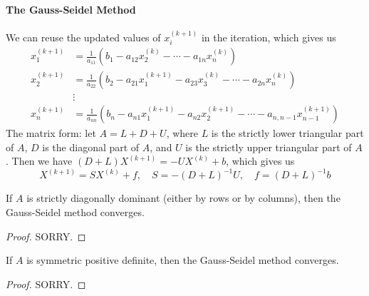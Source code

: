 \documentclass{matharticle}
\begin{document}
\paragraph{The Gauss-Seidel Method}
We can reuse the updated values of $x_i^{(k+1)}$ in the iteration, which gives us
\begin{equation}
	\begin{aligned}
		x_1^{(k+1)} & = \frac{1}{a_{11}} \left( b_1 - a_{12} x_2^{(k)} - \cdots - a_{1n} x_n^{(k)} \right)                                 \\
		x_2^{(k+1)} & = \frac{1}{a_{22}} \left( b_2 - a_{21} x_1^{(k+1)} - a_{23} x_3^{(k)} - \cdots - a_{2n} x_n^{(k)} \right)            \\
		            & \vdots                                                                                                               \\
		x_n^{(k+1)} & = \frac{1}{a_{nn}} \left( b_n - a_{n1} x_1^{(k+1)} - a_{n2} x_2^{(k+1)} - \cdots - a_{n,n-1} x_{n-1}^{(k+1)} \right)
	\end{aligned}
\end{equation}
The matrix form: let $A = L + D + U$, where $L$ is the strictly lower triangular part of $A$, $D$ is the diagonal part of $A$, and $U$ is the strictly upper triangular part of $A$. Then we have $(D + L) X^{(k+1)} = - U X^{(k)} + b$, which gives us
\begin{equation}
	X^{(k+1)} = S X^{(k)} + f, \quad S = -(D + L)^{-1} U, \quad f = (D + L)^{-1} b
\end{equation}

\begin{theorem}
	If $A$ is strictly diagonally dominant (either by rows or by columns), then the Gauss-Seidel method converges.
\end{theorem}
\begin{proof}
	SORRY.
\end{proof}

\begin{theorem}
	If $A$ is symmetric positive definite, then the Gauss-Seidel method converges.
\end{theorem}
\begin{proof}
	SORRY.
\end{proof}
\end{document}

